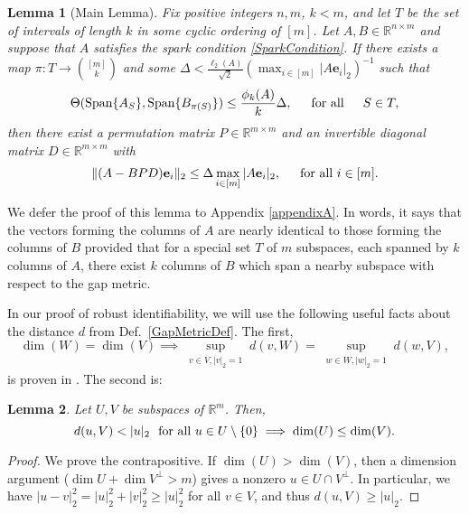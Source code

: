 \documentclass[journal, onecolumn]{IEEEtran}
\newtheorem{lemma}{Lemma}
\begin{document}
\begin{lemma}[Main Lemma]\label{MainLemma}
Fix positive integers $n, m$, $k < m$, and let $T$ be the set of intervals of length $k$ in some cyclic ordering of $[m]$. Let $A, B \in \mathbb{R}^{n \times m}$ and suppose that $A$ satisfies the spark condition \eqref{SparkCondition}.  If there exists a map $\pi: T \to {[m] \choose k}$ and some $\Delta < \frac{\ell_{2}(A)}{\sqrt{2}} (\max_{i \in [m]}|A\mathbf{e}_i|_2)^{-1}$ such that 
\begin{equation}\label{GapUpperBound}
\Theta(\text{Span}\{A_{S}\}, \text{Span}\{B_{\pi(S)}\}) \leq \frac{ \phi_k(A) }{k} \Delta, \indent \text{for all} \indent S \in T,
\end{equation}
%
then there exist a permutation matrix $P \in \mathbb{R}^{m \times m}$ and an invertible diagonal matrix $D \in \mathbb{R}^{m \times m}$ with
\begin{align}
\|(A - BPD)\mathbf{e}_i\|_2 \leq \Delta \max_{i \in [m]}|A\mathbf{e}_i|_2, \indent \text{for all } i \in [m].
\end{align}
\end{lemma}
We defer the proof of this lemma to Appendix \ref{appendixA}. In words, it says that the vectors forming the columns of $A$ are nearly identical to those forming the columns of $B$ provided that for a special set $T$ of $m$ subspaces, each spanned by $k$ columns of $A$, there exist $k$ columns of $B$ which span a nearby subspace with respect to the gap metric.

In our proof of robust identifiability, we will use the following useful facts about the distance $d$ from Def.~\ref{GapMetricDef}. The first, 
\begin{equation}\label{SubspaceMetricSameDim}
\dim(W) = \dim(V) \implies \sup_{\substack{v \in V, |v|_2 = 1}}  d(v,W)  = \sup_{\substack{w \in W, |w|_2 = 1}} d(w,V),
\end{equation}
is proven in \cite[Lemma 3.3]{Morris10}. The second is:
\begin{lemma}\label{MinDimLemma}
Let $U, V$ be subspaces of $\mathbb{R}^{m}$. Then,
\begin{equation}\label{MinDim}
d(u,V) < |u|_2 \ \ \text{\rm for all } u \in U \setminus{\{0\}} \implies \dim(U) \leq \dim(V).
\end{equation}
\end{lemma}

\begin{proof}
We prove the contrapositive.  If $\dim(U) > \dim(V)$, then a dimension argument ($\dim U + \dim V^\perp > m$) gives a nonzero $u \in U \cap V^\perp$.  In particular, we have $|u - v|_2^2 = |u|_2^2 + |v|_2^2 \geq |u|_2^2$ for all $v \in V$, and thus $d(u,V) \geq |u|_2$.
\end{proof}
\end{document}

